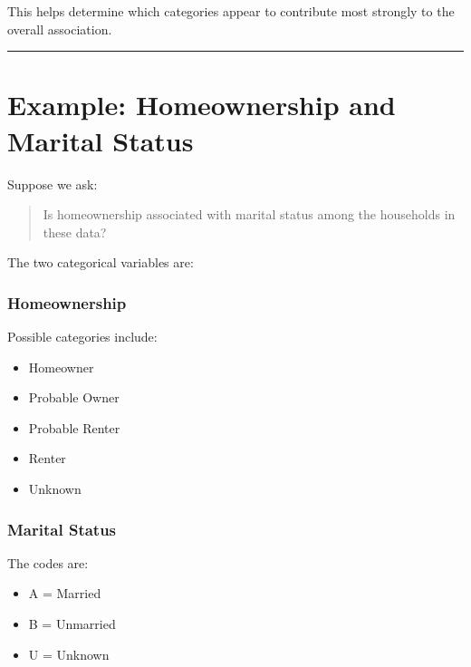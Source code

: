 \documentclass[
  letterpaper,
  DIV=11,
  numbers=noendperiod]{scrreprt}
\newenvironment{Shaded}{\begin{snugshade}}{\end{snugshade}}
\newcommand{\NormalTok}[1]{\textcolor[rgb]{0.00,0.23,0.31}{#1}}
\newcommand{\SpecialCharTok}[1]{\textcolor[rgb]{0.37,0.37,0.37}{#1}}
\providecommand{\tightlist}{%
  \setlength{\itemsep}{0pt}\setlength{\parskip}{0pt}}
\begin{document}
\begin{Shaded}
\end{Shaded}

This helps determine which categories appear to contribute most strongly
to the overall association.

\begin{center}\rule{0.5\linewidth}{0.5pt}\end{center}


\chapter{Example: Homeownership and Marital
Status}\label{example-homeownership-and-marital-status}

Suppose we ask:

\begin{quote}
Is homeownership associated with marital status among the households in
these data?
\end{quote}

The two categorical variables are:

\subsection{Homeownership}\label{homeownership}

Possible categories include:

\begin{itemize}
\tightlist
\item
  Homeowner
\item
  Probable Owner
\item
  Probable Renter
\item
  Renter
\item
  Unknown
\end{itemize}

\subsection{Marital Status}\label{marital-status}

The codes are:

\begin{itemize}
\tightlist
\item
  A = Married
\item
  B = Unmarried
\item
  U = Unknown
\end{itemize}
\end{document}

